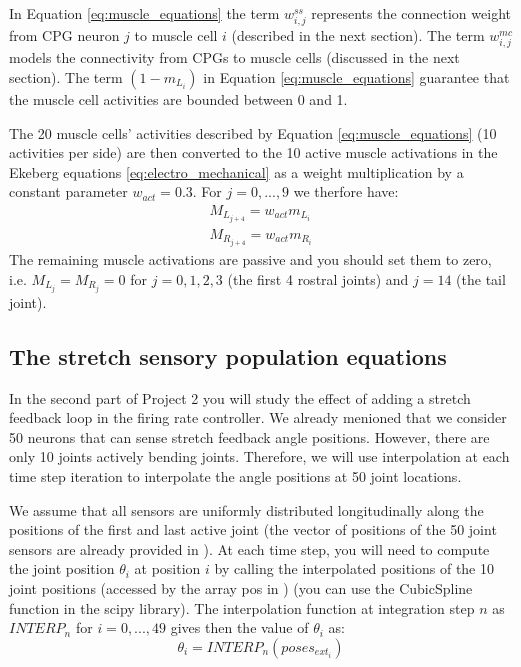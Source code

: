 \documentclass{cmc}
\begin{document}
In Equation \ref{eq:muscle_equations} the term $w^{ss}_{i,j}$ represents the connection weight from CPG neuron $j$ to muscle cell $i$ (described in the next section). The term $w^{mc}_{i,j}$  models the connectivity from CPGs to muscle cells (discussed in the next section). The term $(1-m_{L_i})$ in Equation \ref{eq:muscle_equations} guarantee that the muscle cell activities are bounded between 0 and 1.

The 20 muscle cells' activities described by Equation \ref{eq:muscle_equations} (10 activities per side) are then converted to the 10 active muscle activations in the Ekeberg equations \ref{eq:electro_mechanical} as a weight multiplication by a constant parameter $w_{act}=0.3$. For $j=0,...,9$ we therfore have:
\begin{equation}
    \begin{array}{lcl}
	M_{L_{j+4}} = w_{act} m_{L_i}\\
	M_{R_{j+4}} = w_{act} m_{R_i}
    \end{array}
	\label{eq:mc_activation_conversion}
\end{equation}
The remaining muscle activations are passive and you should set them to zero, i.e. $M_{L_{j}}=M_{R_{j}}=0$ for $j=0,1,2,3$ (the first 4 rostral joints) and $j=14$ (the tail joint).


\subsection*{The stretch sensory population equations}
In the second part of Project 2 you will study the effect of adding a stretch feedback loop in the firing rate controller. We already menioned that we consider 50 neurons that can sense stretch feedback angle positions. However, there are only 10 joints actively bending joints. Therefore, we will use interpolation at each time step iteration to interpolate the angle positions at 50 joint locations.

We assume that all sensors are uniformly distributed longitudinally along the positions of the first and last active joint (the vector of positions of the 50 joint sensors are already provided in ). At each time step, you will need to compute the joint position $\theta_i$ at position $i$ by calling the interpolated positions of the 10 joint positions (accessed by the array pos in ) (you can use the CubicSpline function in the scipy library). The interpolation function at integration step $n$ as $INTERP_n$ for $i=0,...,49$ gives then the value of $\theta_i$ as:
$$ \theta_i = INTERP_n(poses_{ext_i}) $$
\end{document}
